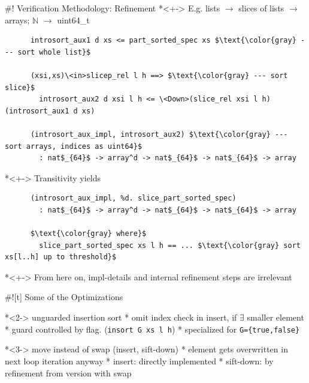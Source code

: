 \documentclass[fleqn]{beamer}
\newcommand{\isai}{\lstinline[language=isabelle,basicstyle=\normalsize\ttfamily\slshape]}
\begin{document}
#! Verification Methodology: Refinement
  *<+-> E.g. lists $\rightarrow$ slices of lists $\rightarrow$ arrays; $\mathbb N$ $\rightarrow$ uint64\_t
    \onslide<+->
    \begin{lstlisting}
      introsort_aux1 d xs <= part_sorted_spec xs $\text{\color{gray} --- sort whole list}$

      (xsi,xs)\<in>slicep_rel l h ==> $\text{\color{gray} --- sort slice}$
        introsort_aux2 d xsi l h <= \<Down>(slice_rel xsi l h) (introsort_aux1 d xs)

      (introsort_aux_impl, introsort_aux2) $\text{\color{gray} --- sort arrays, indices as uint64}$
        : nat$_{64}$ -> array^d -> nat$_{64}$ -> nat$_{64}$ -> array
    \end{lstlisting}

  *<+-> Transitivity yields
    \begin{lstlisting}
      (introsort_aux_impl, %d. slice_part_sorted_spec)
        : nat$_{64}$ -> array^d -> nat$_{64}$ -> nat$_{64}$ -> array

      $\text{\color{gray} where}$
        slice_part_sorted_spec xs l h == ... $\text{\color{gray} sort xs[l..h] up to threshold}$

    \end{lstlisting}

  *<+-> From here on, impl-details and internal refinement steps are irrelevant

#![t] Some of the Optimizations

  *<2-> unguarded insertion sort
    * omit index check in insert, if $\exists$ smaller element
    * guard controlled by flag. (\isai{insort G xs l h})
    * specialized for \isai$G={true,false}$

  *<3-> move instead of swap (insert, sift-down)
    * element gets overwritten in next loop iteration anyway
    * insert: directly implemented
    * sift-down: by refinement from version with swap

\end{document}
